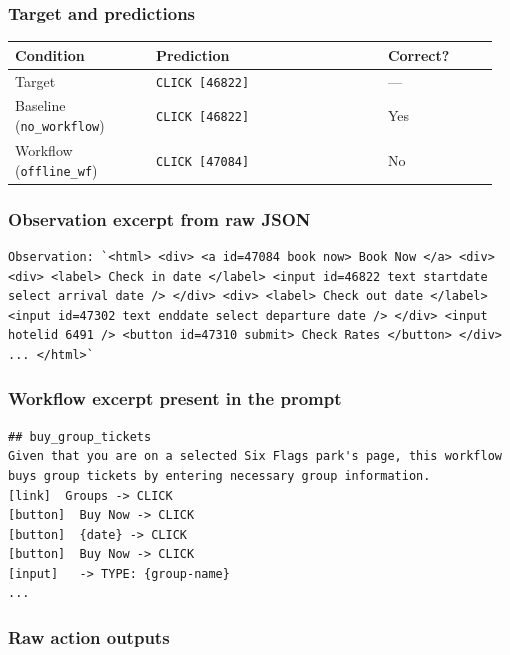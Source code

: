 \subsubsection{Target and
predictions}

{\def\LTcaptype{} %
\begin{longtable}[]{@{}>{\raggedright\arraybackslash}p{0.28\linewidth}>{\raggedright\arraybackslash}p{0.46\linewidth}>{\raggedright\arraybackslash}p{0.22\linewidth}@{}}
\toprule\noalign{}
Condition & Prediction & Correct? \\
\midrule\noalign{}
\endhead
\bottomrule\noalign{}
\endlastfoot
Target & \texttt{CLICK\ {[}46822{]}} & --- \\
Baseline (\texttt{no\_workflow}) & \texttt{CLICK\ {[}46822{]}} & Yes \\
Workflow (\texttt{offline\_wf}) & \texttt{CLICK\ {[}47084{]}} & No \\
\end{longtable}
}

\subsubsection{Observation excerpt from raw
JSON}

\begin{verbatim}
Observation: `<html> <div> <a id=47084 book now> Book Now </a> <div> <div> <label> Check in date </label> <input id=46822 text startdate select arrival date /> </div> <div> <label> Check out date </label> <input id=47302 text enddate select departure date /> </div> <input hotelid 6491 /> <button id=47310 submit> Check Rates </button> </div> ... </html>`
\end{verbatim}

\subsubsection{Workflow excerpt present in the
prompt}

\begin{verbatim}
## buy_group_tickets
Given that you are on a selected Six Flags park's page, this workflow buys group tickets by entering necessary group information.
[link]  Groups -> CLICK
[button]  Buy Now -> CLICK
[button]  {date} -> CLICK
[button]  Buy Now -> CLICK
[input]   -> TYPE: {group-name}
...
\end{verbatim}

\subsubsection{Raw action outputs}

